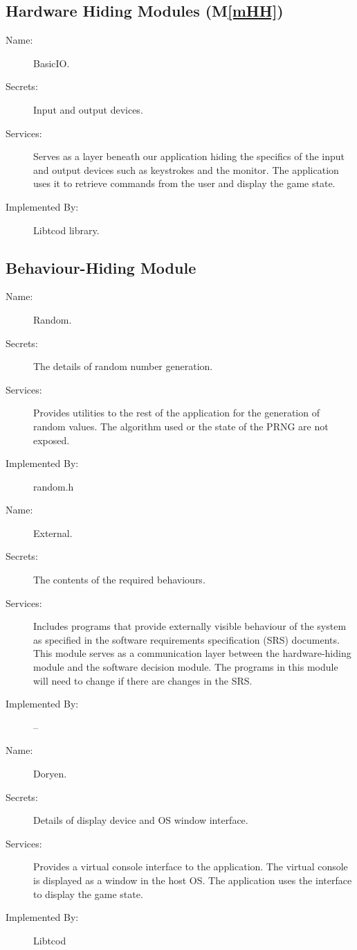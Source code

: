\documentclass[12pt, titlepage]{article}
\newcommand{\mref}[1]{M\ref{#1}}
\begin{document}
	\subsection{Hardware Hiding Modules (\mref{mHH})}

		\bigskip\begin{description}
			\item[Name:]BasicIO.
			\item[Secrets:]Input and output devices.
			\item[Services:]Serves as a layer beneath our application hiding the specifics of the
			input and output devices such as keystrokes and the monitor. The application uses it
			to retrieve commands from the user and display the game state.
			\item[Implemented By:] Libtcod library.
		\end{description}

	\subsection{Behaviour-Hiding Module}

		\bigskip\begin{description}
			\item[Name:]Random.
			\item[Secrets:]The details of random number generation.
			\item[Services:]Provides utilities to the rest of the application for the generation of random
			values. The algorithm used or the state of the PRNG are not exposed.
			\item[Implemented By:] random.h
		\end{description}

		\bigskip\begin{description}
			\item[Name:]External.
			\item[Secrets:]The contents of the required behaviours.
			\item[Services:]Includes programs that provide externally visible behaviour of the system as specified in the software requirements specification (SRS) documents. This module serves as a communication layer between the hardware-hiding module and the software decision module. The programs in this module will need to change if there are changes in the SRS.
			\item[Implemented By:] --
		\end{description}

		\bigskip\begin{description}
			\item[Name:]Doryen.
			\item[Secrets:]Details of display device and OS window interface.
			\item[Services:]Provides a virtual console interface to the application. The virtual console is displayed as a window in the host OS. The application uses the interface to display the game state.
			\item[Implemented By:]Libtcod
		\end{description}
\end{document}

